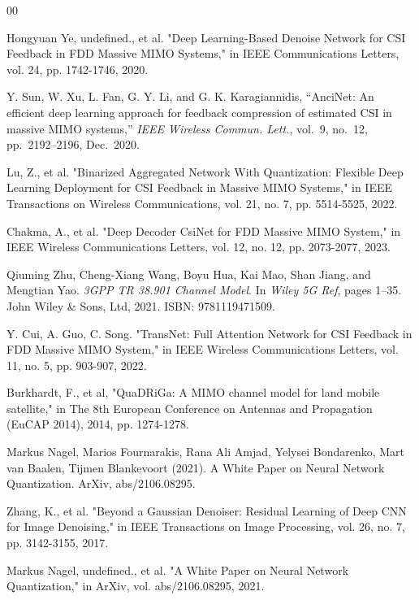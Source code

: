\documentclass[lettersize,journal]{IEEEtran}
\begin{document}
\begin{thebibliography}{00}
   

    Hongyuan Ye, undefined., et al. "Deep Learning-Based Denoise Network for CSI Feedback in FDD Massive MIMO Systems," in IEEE Communications Letters, vol. 24, pp. 1742-1746, 2020.

	Y. Sun, W. Xu, L. Fan, G. Y. Li, and G. K. Karagiannidis, ``AnciNet: An efficient deep learning approach for feedback compression of estimated CSI in massive MIMO systems,'' \emph{IEEE Wireless Commun. Lett.}, vol.~9, no.~12, pp.~2192--2196, Dec.~2020.


    Lu, Z., et al. "Binarized Aggregated Network With Quantization: Flexible Deep Learning Deployment for CSI Feedback in Massive MIMO Systems," in IEEE Transactions on Wireless Communications, vol. 21, no. 7, pp. 5514-5525, 2022.

   

    Chakma, A., et al. "Deep Decoder CsiNet for FDD Massive MIMO System," in IEEE Wireless Communications Letters, vol. 12, no. 12, pp. 2073-2077, 2023.
    
    Qiuming Zhu, Cheng-Xiang Wang, Boyu Hua, Kai Mao, Shan Jiang, and Mengtian Yao.
    \newblock \emph{3GPP TR 38.901 Channel Model}.
    \newblock In \emph{Wiley 5G Ref}, pages 1--35. John Wiley \& Sons, Ltd, 2021.
    \newblock ISBN: 9781119471509.
    

    Y. Cui, A. Guo, C. Song. "TransNet: Full Attention Network for CSI Feedback in FDD Massive MIMO System," in IEEE Wireless Communications Letters, vol. 11, no. 5, pp. 903-907, 2022.

    Burkhardt, F., et al, "QuaDRiGa: A MIMO channel model for land mobile satellite," in The 8th European Conference on Antennas and Propagation (EuCAP 2014), 2014, pp. 1274-1278.

    Markus Nagel, Marios Fournarakis, Rana Ali Amjad, Yelysei Bondarenko, Mart van Baalen, Tĳmen Blankevoort (2021). A White Paper on Neural Network Quantization. ArXiv, abs/2106.08295.

    Zhang, K., et al. "Beyond a Gaussian Denoiser: Residual Learning of Deep CNN for Image Denoising," in IEEE Transactions on Image Processing, vol. 26, no. 7, pp. 3142-3155, 2017.

    Markus Nagel, undefined., et al. "A White Paper on Neural Network Quantization," in ArXiv, vol. abs/2106.08295, 2021.


\end{thebibliography}
\end{document}

